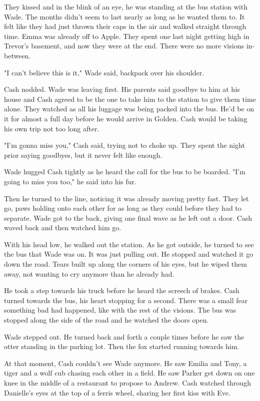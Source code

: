 They kissed and in the blink of an eye, he was standing at the bus station with Wade. The months didn't seem to last nearly as long as he wanted them to. It felt like they had just thrown their caps in the air and walked straight through time. Emma was already off to Apple. They spent one last night getting high in Trevor's basement, and now they were at the end. There were no more visions in-between.

"I can't believe this is it," Wade said, backpack over his shoulder.

Cash nodded. Wade was leaving first. His parents said goodbye to him at his house and Cash agreed to be the one to take him to the station to give them time alone. They watched as all his luggage was being packed into the bus. He'd be on it for almost a full day before he would arrive in Golden. Cash would be taking his own trip not too long after.

"I'm gonna miss you," Cash said, trying not to choke up. They spent the night prior saying goodbyes, but it never felt like enough.

Wade hugged Cash tightly as he heard the call for the bus to be boarded. "I'm going to miss you too," he said into his fur.

Then he turned to the line, noticing it was already moving pretty fast. They let go, paws holding onto each other for as long as they could before they had to separate. Wade got to the back, giving one final wave as he left out a door. Cash waved back and then watched him go.

With his head low, he walked out the station. As he got outside, he turned to see the bus that Wade was on. It was just pulling out. He stopped and watched it go down the road. Tears built up along the corners of his eyes, but he wiped them away, not wanting to cry anymore than he already had.

He took a step towards his truck before he heard the screech of brakes. Cash turned towards the bus, his heart stopping for a second. There was a small fear something bad had happened, like with the rest of the visions. The bus was stopped along the side of the road and he watched the doors open.

Wade stepped out. He turned back and forth a couple times before he saw the otter standing in the parking lot. Then the fox started running towards him.

At that moment, Cash couldn't see Wade anymore. He saw Emilia and Tony, a tiger and a wolf cub chasing each other in a field. He saw Parker get down on one knee in the middle of a restaurant to propose to Andrew. Cash watched through Danielle's eyes at the top of a ferris wheel, sharing her first kiss with Eve.

